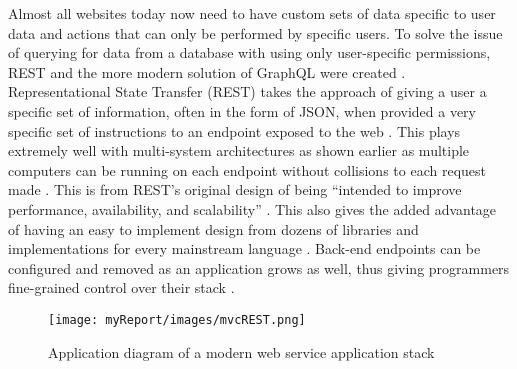 Almost all websites today now need to have custom sets of data specific to user data and actions that can only be performed by specific users. To solve the issue of querying for data from a database with using only user-specific permissions, REST and the more modern solution of GraphQL were created \cite{Brito_Valente_2020}. Representational State Transfer (REST) takes the approach of giving a user a specific set of information, often in the form of JSON, when provided a very specific set of instructions to an endpoint exposed to the web \cite{Brito_Valente_2020}. This plays extremely well with multi-system architectures as shown earlier as multiple computers can be running on each endpoint without collisions to each request made \cite{Villamizar_Garcés_Castro_Salamanca_Casallas_2017}. This is from REST’s original  design of being “intended to improve performance, availability, and scalability” \cite{Brito_Valente_2020}. This also gives the added advantage of having an easy to implement design from dozens of libraries and implementations for every mainstream language \cite{Chen1_Ji1_Fan1_Zhan2_2017}. Back-end endpoints can be configured and removed as an application grows as well, thus giving programmers fine-grained control over their stack \cite{Chen1_Ji1_Fan1_Zhan2_2017}.

\begin{figure}[H]
\centering
\texttt{[image: myReport/images/mvcREST.png]}
\caption{Application diagram of a modern web service application stack \cite{Chen1_Ji1_Fan1_Zhan2_2017}}
\label{fig:mvcREST}
\end{figure}

